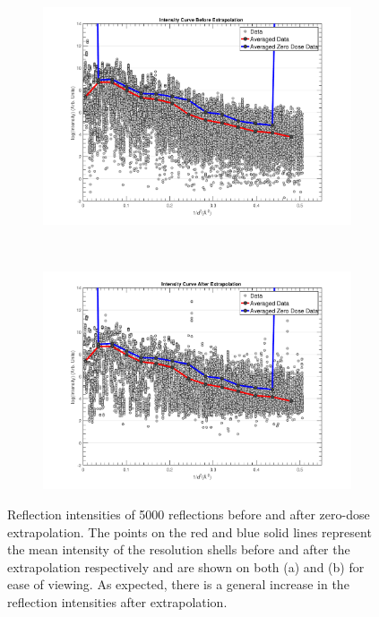 \begin{figure}
	\centering
	\begin{subfigure}[b]{0.95\textwidth}
		\centering
		\includegraphics[width=\textwidth]{figures/zde/IntensityCurve_BeforeExtrapolation.pdf}
		\caption{}
		\label{fig:Before extrapolation all observations - Extrapolation method}
	\end{subfigure}
	\\
	\begin{subfigure}[b]{0.95\textwidth}
		\centering
		\includegraphics[width=\textwidth]{figures/zde/IntensityCurve_AfterExtrapolation.pdf}
		\caption{}
		\label{fig:After extrapolation all observations - Extrapolation method}
	\end{subfigure}
	\caption[Reflection intensities of 5000 reflections before and after zero-dose extrapolation.]{Reflection intensities of 5000 reflections before and after zero-dose extrapolation.
	The points on the red and blue solid lines represent the mean intensity of the resolution shells before and after the extrapolation respectively and are shown on both (a) and (b) for ease of viewing.
	As expected, there is a general increase in the reflection intensities after extrapolation.}
	\label{fig:Before and after extrapolation results - Extrapolation method}
\end{figure}
